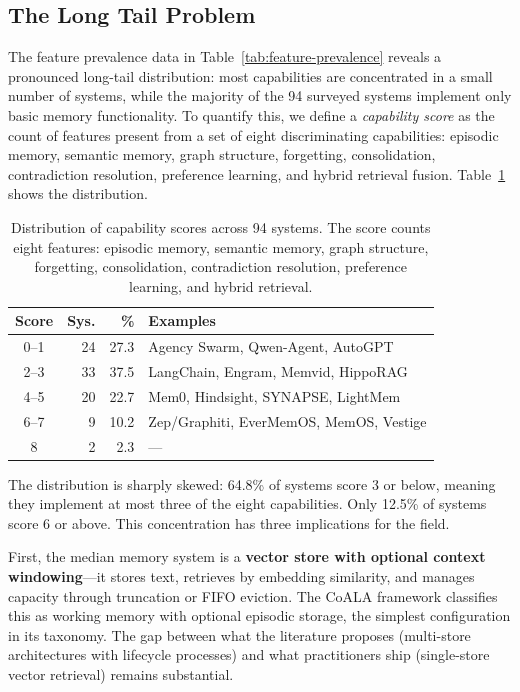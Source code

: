 \subsection{The Long Tail Problem}
\label{sec:long-tail}

The feature prevalence data in Table~\ref{tab:feature-prevalence} reveals a
pronounced long-tail distribution: most capabilities are concentrated in a
small number of systems, while the majority of the 94 surveyed systems
implement only basic memory functionality. To quantify this, we define a
\emph{capability score} as the count of features present from a set of eight
discriminating capabilities: episodic memory, semantic memory, graph structure,
forgetting, consolidation, contradiction resolution, preference learning, and
hybrid retrieval fusion. Table~\ref{tab:capability-distribution} shows the
distribution.

\begin{table}[!t]
\centering
\caption{Distribution of capability scores across 94 systems.  The score counts eight features: episodic memory, semantic memory, graph structure, forgetting, consolidation, contradiction resolution, preference learning, and hybrid retrieval.}
\label{tab:capability-distribution}
\small
\begin{tabular}{@{}crrp{3.8cm}@{}}
\toprule
\textbf{Score} & \textbf{Sys.} & \textbf{\%} & \textbf{Examples} \\
\midrule
0--1 & 24 & 27.3 & Agency Swarm, Qwen-Agent, AutoGPT \\
2--3 & 33 & 37.5 & LangChain, Engram, Memvid, HippoRAG \\
4--5 & 20 & 22.7 & Mem0, Hindsight, SYNAPSE, LightMem \\
6--7 &  9 & 10.2 & Zep/Graphiti, EverMemOS, MemOS, Vestige \\
8    &  2 &  2.3 & --- \\
\bottomrule
\end{tabular}
\end{table}

The distribution is sharply skewed: 64.8\% of systems score 3 or below,
meaning they implement at most three of the eight capabilities. Only 12.5\% of
systems score 6 or above. This concentration has three implications for the
field.

First, the median memory system is a \textbf{vector store with optional
context windowing}---it stores text, retrieves by embedding similarity, and
manages capacity through truncation or FIFO eviction. The CoALA framework
\cite{sumers2024coala} classifies this as working memory with optional
episodic storage, the simplest configuration in its taxonomy. The gap between
what the literature proposes (multi-store architectures with lifecycle
processes) and what practitioners ship (single-store vector retrieval) remains
substantial.

